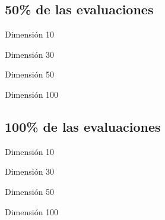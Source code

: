 \subsection*{50\% de las evaluaciones}

\begin{table}[H]
    \begin{minipage}{.5\linewidth}
      \caption{Dimensión 10}
      \centering
        
    \end{minipage}%
    \begin{minipage}{.5\linewidth}
      \centering
        \caption{Dimensión 30}

    \end{minipage} 
\end{table}

\begin{table}[H]
    \begin{minipage}{.5\linewidth}
      \caption{Dimensión 50}
      \centering
        
    \end{minipage}%
    \begin{minipage}{.5\linewidth}
      \centering
      \caption{Dimensión 100}
         
    \end{minipage} 
\end{table}


\subsection*{100\% de las evaluaciones}

\begin{table}[H]
    \begin{minipage}{.5\linewidth}
      \caption{Dimensión 10}
      \centering
        
    \end{minipage}%
    \begin{minipage}{.5\linewidth}
      \centering
        \caption{Dimensión 30}

    \end{minipage} 
\end{table}

\begin{table}[H]
    \begin{minipage}{.5\linewidth}
      \caption{Dimensión 50}
      \centering
        
    \end{minipage}%
    \begin{minipage}{.5\linewidth}
      \centering
      \caption{Dimensión 100}
         
    \end{minipage} 
\end{table}











